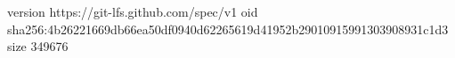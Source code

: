 version https://git-lfs.github.com/spec/v1
oid sha256:4b26221669db66ea50df0940d62265619d41952b29010915991303908931c1d3
size 349676
